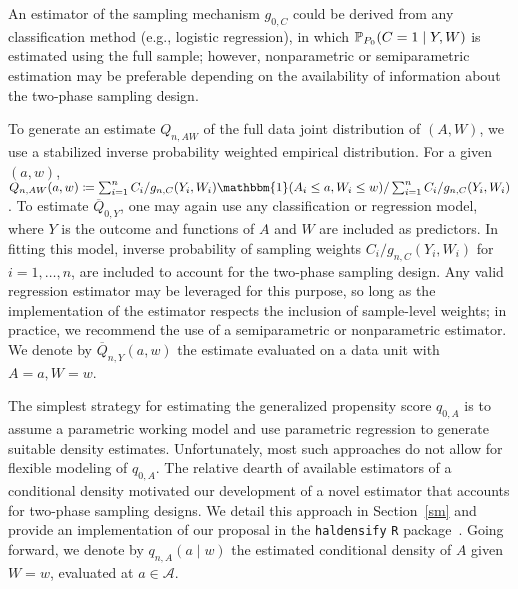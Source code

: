 An estimator of the sampling mechanism $g_{0,C}$ could be derived from any
classification method (e.g., logistic regression), in which $\mathbb{P}_{P_0}(C
= 1 \mid Y, W)$ is estimated using the full sample; however, nonparametric or
semiparametric estimation may be preferable depending on the availability of
information about the two-phase sampling design.

To generate an estimate $Q_{n,AW}$ of the full data joint distribution of
$(A,W)$, we use a stabilized inverse probability weighted empirical
distribution. For a given $(a,w)$,  $Q_{n,AW}(a,w) \coloneqq \sum_{i=1}^n C_i/
g_{n,C}(Y_i, W_i) \mathbbm{1}(A_i \le a, W_i \le w) / \sum_{i=1}^n
C_i/g_{n,C}(Y_i,W_i)$. To estimate $\overline{Q}_{0,Y}$, one may again use any
classification or regression model, where $Y$ is the outcome and functions of
$A$ and $W$ are included as predictors. In fitting this model, inverse
probability of sampling weights $C_i / g_{n, C} (Y_i, W_i)$ for $i=1, \ldots,
n$, are included to account for the two-phase sampling design. Any valid
regression estimator may be leveraged for this purpose, so long as the
implementation of the estimator respects the inclusion of sample-level weights;
in practice, we recommend the use of a semiparametric or nonparametric
estimator. We denote by $\overline{Q}_{n,Y}(a,w)$ the estimate evaluated on
a data unit with $A = a, W = w$.

The simplest strategy for estimating the generalized propensity score $q_{0,A}$
is to assume a parametric working model and use parametric regression to
generate suitable density estimates. Unfortunately, most such approaches do not
allow for flexible modeling of $q_{0,A}$.
The relative dearth of available estimators of a conditional density motivated
our development of a novel estimator that accounts for two-phase sampling
designs. We detail this approach in Section~\ref{sm} and
provide an implementation of our proposal in the \texttt{haldensify} \texttt{R}
package~\citep{hejazi2020haldensify}. Going forward, we denote by $q_{n,A}(a
\mid w)$ the estimated conditional density of $A$ given $W = w$, evaluated at
$a \in \mathcal{A}$.

